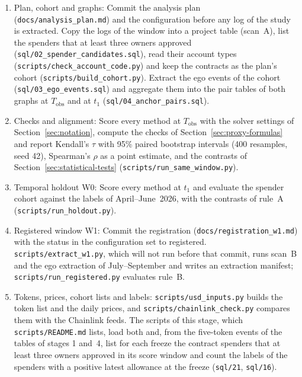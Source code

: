 \begin{enumerate}
\item Plan, cohort and graphs: Commit the analysis plan (\texttt{docs/analysis\_plan.md}) and the configuration before any log of the study is extracted. Copy the logs of the window into a project table (scan~A), list the spenders that at least three owners approved (\texttt{sql/02\_spender\_candidates.sql}), read their account types (\texttt{scripts/check\_account\_code.py}) and keep the contracts as the plan's cohort (\texttt{scripts/build\_cohort.py}). Extract the ego events of the cohort (\texttt{sql/03\_ego\_events.sql}) and aggregate them into the pair tables of both graphs at $T_{\mathrm{obs}}$ and at $t_1$ (\texttt{sql/04\_anchor\_pairs.sql}).
\item Checks and alignment: Score every method at $T_{\mathrm{obs}}$ with the solver settings of Section~\ref{sec:notation}, compute the checks of Section~\ref{sec:proxy-formulas} and report Kendall's $\tau$ with 95\% paired bootstrap intervals (400 resamples, seed 42), Spearman's $\rho$ as a point estimate, and the contrasts of Section~\ref{sec:statistical-tests} (\texttt{scripts/run\_same\_window.py}).
\item Temporal holdout W0: Score every method at $t_1$ and evaluate the spender cohort against the labels of April--June~2026, with the contrasts of rule~A (\texttt{scripts/run\_holdout.py}).
\item Registered window W1: Commit the registration (\texttt{docs/registration\_w1.md}) with the status in the configuration set to registered. \texttt{scripts/extract\_w1.py}, which will not run before that commit, runs scan~B and the ego extraction of July--September and writes an extraction manifest; \texttt{scripts/run\_registered.py} evaluates rule~B.
\item Tokens, prices, cohort lists and labels: \texttt{scripts/usd\_inputs.py} builds the token list and the daily prices, and \texttt{scripts/chainlink\_check.py} compares them with the Chainlink feeds. The scripts of this stage, which \texttt{scripts/README.md} lists, load both and, from the five-token events of the tables of stages 1 and~4, list for each freeze the contract spenders that at least three owners approved in its score window and count the labels of the spenders with a positive latest allowance at the freeze (\texttt{sql/21}, \texttt{sql/16}).

\end{enumerate}
